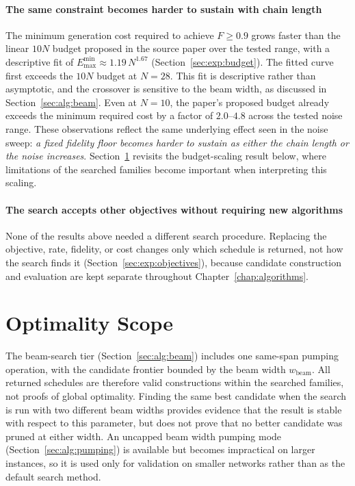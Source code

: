 \paragraph{The same constraint becomes harder to sustain with chain length}
The minimum generation cost required to achieve $F\ge0.9$ grows faster than the linear $10N$ budget proposed in the source paper over the tested range, with a descriptive fit of $E_{\max}^{\min}\approx1.19\,N^{1.67}$ (Section~\ref{sec:exp:budget}). The fitted curve first exceeds the $10N$ budget at $N=28$. This fit is descriptive rather than asymptotic, and the crossover is sensitive to the beam width, as discussed in Section~\ref{sec:alg:beam}. Even at $N=10$, the paper's proposed budget already exceeds the minimum required cost by a factor of $2.0$--$4.8$ across the tested noise range. These observations reflect the same underlying effect seen in the noise sweep: \emph{a fixed fidelity floor becomes harder to sustain as either the chain length or the noise increases}. Section~\ref{sec:disc:scope} revisits the budget-scaling result below, where limitations of the searched families become important when interpreting this scaling.

\paragraph{The search accepts other objectives without requiring new algorithms}
None of the results above needed a different search procedure. Replacing the objective, rate, fidelity, or cost changes only which schedule is returned, not how the search finds it (Section~\ref{sec:exp:objectives}), because candidate construction and evaluation are kept separate throughout Chapter~\ref{chap:algorithms}.

\section{Optimality Scope}
\label{sec:disc:scope}


The beam-search tier (Section~\ref{sec:alg:beam}) includes one same-span pumping operation, with the candidate frontier bounded by the beam width $w_{\mathrm{beam}}$. All returned schedules are therefore valid constructions within the searched families, not proofs of global optimality. Finding the same best candidate when the search is run with two different beam widths provides evidence that the result is stable with respect to this parameter, but does not prove that no better candidate was pruned at either width. An uncapped beam width pumping mode (Section~\ref{sec:alg:pumping}) is available but becomes impractical on larger instances, so it is used only for validation on smaller networks rather than as the default search method.


